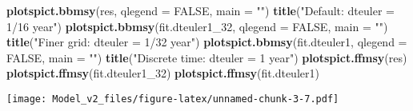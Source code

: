\documentclass[
]{article}
\newenvironment{Shaded}{\begin{snugshade}}{\end{snugshade}}
\newcommand{\DataTypeTok}[1]{\textcolor[rgb]{0.13,0.29,0.53}{#1}}
\newcommand{\DecValTok}[1]{\textcolor[rgb]{0.00,0.00,0.81}{#1}}
\newcommand{\KeywordTok}[1]{\textcolor[rgb]{0.13,0.29,0.53}{\textbf{#1}}}
\newcommand{\NormalTok}[1]{#1}
\newcommand{\OtherTok}[1]{\textcolor[rgb]{0.56,0.35,0.01}{#1}}
\newcommand{\StringTok}[1]{\textcolor[rgb]{0.31,0.60,0.02}{#1}}
\begin{document}
\begin{Shaded}
\begin{Highlighting}[]
\KeywordTok{plotspict.bbmsy}\NormalTok{(res, }\DataTypeTok{qlegend =} \OtherTok{FALSE}\NormalTok{, }\DataTypeTok{main =} \StringTok{""}\NormalTok{)}
\KeywordTok{title}\NormalTok{(}\StringTok{"Default: dteuler = 1/16 year"}\NormalTok{)}
\KeywordTok{plotspict.bbmsy}\NormalTok{(fit.dteuler1_}\DecValTok{32}\NormalTok{, }\DataTypeTok{qlegend =} \OtherTok{FALSE}\NormalTok{, }\DataTypeTok{main =} \StringTok{""}\NormalTok{)}
\KeywordTok{title}\NormalTok{(}\StringTok{"Finer grid: dteuler = 1/32 year"}\NormalTok{)}
\KeywordTok{plotspict.bbmsy}\NormalTok{(fit.dteuler1, }\DataTypeTok{qlegend =} \OtherTok{FALSE}\NormalTok{, }\DataTypeTok{main =} \StringTok{""}\NormalTok{)}
\KeywordTok{title}\NormalTok{(}\StringTok{"Discrete time: dteuler = 1 year"}\NormalTok{)}
\KeywordTok{plotspict.ffmsy}\NormalTok{(res)}
\KeywordTok{plotspict.ffmsy}\NormalTok{(fit.dteuler1_}\DecValTok{32}\NormalTok{)}
\KeywordTok{plotspict.ffmsy}\NormalTok{(fit.dteuler1)}
\end{Highlighting}
\end{Shaded}

\texttt{[image: Model\_v2\_files/figure-latex/unnamed-chunk-3-7.pdf]}
\end{document}
